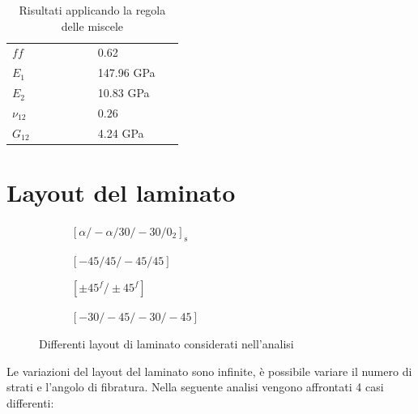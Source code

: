 \documentclass[a4paper,num-refs]{oup-contemporary}
\begin{document}
\begin{table}[h!]
	\centering	
	\begin{tabular}{ m{0.4\linewidth} m{0.4\linewidth}  }
		\toprule
		$ff$  & 0.62 \\
		$E_{1}$  & 147.96 GPa  \\
		$E_{2}$  & 10.83 GPa  \\
		$\nu_{12}$ & $0.26$ \\
		$G_{12}$ & 4.24 GPa \\
		\bottomrule
	\end{tabular}
	\captionsetup{justification=centering}
	\caption{Risultati applicando la regola delle miscele}
	\label{tab:miscele}
\end{table}

\section{Layout del laminato}

\begin{figure}[bt!]
	\centering\captionsetup[subfigure]{justification=centering}
	
	\begin{subfigure}[c]{0.24\textwidth}
		\centering
	\def\svgwidth{\textwidth}

		\caption{$[\alpha /-\alpha / 30 /-30 / 0_{2}]_{\mathrm{s}}$ }
		
	\end{subfigure}
	\hfill
	\begin{subfigure}[c]{0.24\textwidth}
		\centering 
		\def\svgwidth{\textwidth}

		\caption{$[-45 / 45 /-45 / 45]$}
		
	\end{subfigure}
	\hfill
	\begin{subfigure}[c]{0.24\textwidth}
		\centering
		\def\svgwidth{\textwidth}

		\caption{$[\pm 45^{f} / \pm 45^{f}]$}
		
	\end{subfigure}
	\hfill
	\begin{subfigure}[c]{0.24\textwidth}
		\centering
		\def\svgwidth{\textwidth}
		
		\caption{$[-30 /-45 /-30 /-45]$}
		
	\end{subfigure}
	\hfill
	\caption{Differenti layout di laminato considerati nell'analisi}
	\label{fig:laminates}
\end{figure}

Le variazioni del layout del laminato sono infinite, è possibile variare il numero di strati e l'angolo di fibratura. Nella seguente analisi vengono affrontati 4 casi differenti:
\end{document}
